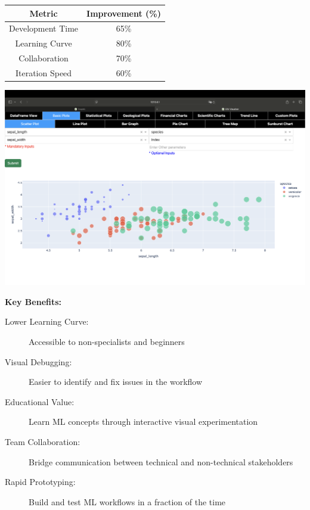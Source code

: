 \documentclass[a0paper,portrait]{article}
\begin{document}
\begin{multicols}{2}
\begin{minipage}{0.48\linewidth}
\begin{center}
\begin{tabular}{|c|c|}
\hline
\textbf{Metric} & \textbf{Improvement (\%)} \\
\hline
Development Time & 65\% \\
\hline
Learning Curve & 80\% \\
\hline
Collaboration & 70\% \\
\hline
Iteration Speed & 60\% \\
\hline
\end{tabular}
\end{center}
\end{minipage}
\begin{minipage}{0.48\linewidth}
\includegraphics[width=\linewidth]{范例数据集的可视化1.png}
\end{minipage}

\textbf{Key Benefits:}
\begin{description}
    \item[Lower Learning Curve:] Accessible to non-specialists and beginners
    \item[Visual Debugging:] Easier to identify and fix issues in the workflow
    \item[Educational Value:] Learn ML concepts through interactive visual experimentation
    \item[Team Collaboration:] Bridge communication between technical and non-technical stakeholders
    \item[Rapid Prototyping:] Build and test ML workflows in a fraction of the time
\end{description}


\end{multicols}
\end{document}
